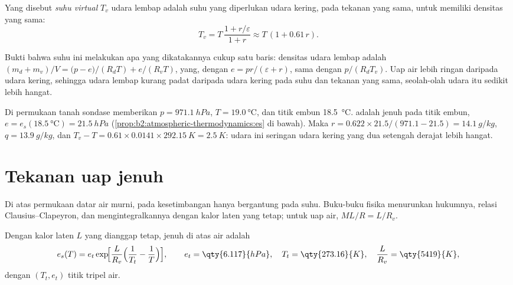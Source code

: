 \begin{definition}\label{def:b2:atmospheric-thermodynamics:virtual}
Yang disebut \emph{suhu virtual} $T_v$ udara lembap adalah suhu
yang diperlukan udara kering, pada tekanan yang sama, untuk memiliki densitas yang sama:
\[
  T_v = T\,\frac{1 + r/\varepsilon}{1 + r} \approx T\,(1 + 0.61\,r) .
\]
\end{definition}

Bukti bahwa suhu ini melakukan apa yang dikatakannya cukup satu baris: densitas udara lembap adalah
$(m_d + m_v)/V = \bigl(p - e\bigr)/(R_dT) + e/(R_vT)$, yang, dengan $e = pr/(\varepsilon + r)$,
sama dengan $p/(R_dT_v)$. Uap air lebih ringan daripada udara kering, sehingga udara lembap kurang padat daripada udara
kering pada suhu dan tekanan yang sama, seolah-olah udara itu sedikit lebih hangat.

\begin{example}\label{ex:b2:atmospheric-thermodynamics:norman}
Di permukaan tanah sondase memberikan $p = \qty{971.1}{hPa}$, $T = \qty{19.0}{\celsius}$, dan titik
embun \qty{18.5}{\celsius}.  adalah  jenuh pada titik
embun, $e = e_s(\qty{18.5}{\celsius}) = \qty{21.5}{hPa}$ (\cref{prop:b2:atmospheric-thermodynamics:es}
di bawah). Maka $r = 0.622 \times 21.5/(971.1 - 21.5) = \qty{14.1}{g/kg}$, $q = \qty{13.9}{g/kg}$,
dan $T_v - T = 0.61 \times 0.0141 \times \qty{292.15}{K} = \qty{2.5}{K}$: udara ini seringan
udara kering yang dua setengah derajat lebih hangat.
\end{example}

\section{Tekanan uap jenuh}\label{sec:b2:atmospheric-thermodynamics:saturation}

Di atas permukaan datar air murni,  pada kesetimbangan hanya bergantung pada
suhu. Buku-buku fisika menurunkan hukumnya, relasi Clausius--Clapeyron, dan mengintegralkannya
dengan kalor laten yang tetap; untuk uap air, $M L/R = L/R_v$.

\begin{proposition}\label{prop:b2:atmospheric-thermodynamics:es}
Dengan kalor laten $L$ yang dianggap tetap,  jenuh di atas air adalah
\[
  e_s(T) = e_t \exp\!\Bigl[\frac{L}{R_v}\Bigl(\frac{1}{T_t} - \frac{1}{T}\Bigr)\Bigr],
  \qquad e_t = \qty{6.117}{hPa}, \quad T_t = \qty{273.16}{K}, \quad \frac{L}{R_v} =
  \qty{5419}{K},
\]
dengan $(T_t, e_t)$ titik tripel air.
\end{proposition}

